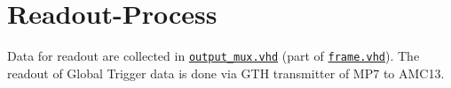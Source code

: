 \section{Readout-Process}

Data for readout are collected in \href{\gitbranch/firmware/hdl/payload/frame/output_mux.vhd}{\texttt{\textquotesingle output\_mux.vhd\textquotesingle }} (part of \href{\gitbranch/firmware/hdl/payload/frame.vhd}{\texttt{\textquotesingle frame.vhd\textquotesingle }}).
The readout of Global Trigger data is done via GTH transmitter of MP7 to AMC13.

\clearpage
